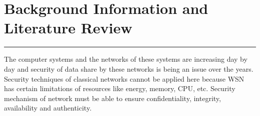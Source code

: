 \chapter{Background Information and Literature Review}
\label{C4} %
\graphicspath{{Figures/PDF/}{Figures/PNG/}}
\noindent\rule{\linewidth}{2pt}


\noindent
The computer systems and the networks of these systems are increasing day by day and security of data share by these networks is being an issue over the years. Security techniques of classical networks cannot be applied here because WSN has certain limitations of resources like energy, memory, CPU, etc. Security mechanism of network must be able to ensure confidentiality, integrity, availability and authenticity.
